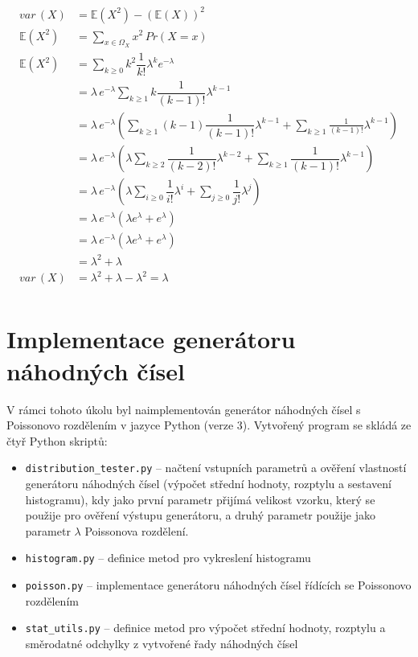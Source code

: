 \documentclass[12pt, a4paper]{article}
\let\oldsection\section
\renewcommand\section{\clearpage\oldsection}
\begin{document}
    \begin{equation}
        \label{variance}
        \begin{split}
            var\,(X) & = \mathbb{E} (X^2) - (\mathbb{E} (X))^2 \\
            \mathbb{E} (X^2) &= \sum_{x \mathop \in \Omega_{X}} x^2 \, Pr(X = x) \\
            \mathbb{E} (X^2) &= \sum_{k \mathop \ge 0} {k^2 \dfrac 1 {k!} \lambda^k e^{-\lambda} } \\
            & = \lambda\, e^{-\lambda} \sum_{k \mathop \ge 1} {k \dfrac 1 {(k - 1)!} \lambda^{k - 1} } \\
            & = \lambda\, e^{-\lambda} ( \sum_{k \mathop \ge 1} {(k - 1) \dfrac 1 {(k - 1)!} \lambda^{k - 1} } + \sum_{k \mathop \ge 1} {\frac 1 {(k - 1)!} \lambda^{k - 1} }  ) \\
            & = \lambda\, e^{-\lambda} ( \lambda \sum_{k \mathop \ge 2} {\dfrac 1 {(k - 2)!} \lambda^{k - 2} } + \sum_{k \mathop \ge 1} {\dfrac 1 {(k - 1)!} \lambda^{k - 1} } ) \\
            & = \lambda\, e^{-\lambda} ( \lambda \sum_{i \mathop \ge 0} {\dfrac 1 {i!} \lambda^i} + \sum_{j \mathop \ge 0} {\dfrac 1 {j!} \lambda^j} ) \\
            & = \lambda\, e^{-\lambda} ( \lambda e^\lambda + e^\lambda) \\
            & = \lambda\, e^{-\lambda} ( \lambda e^\lambda + e^\lambda) \\
            & = \lambda^2 + \lambda \\
            var\,(X) & = \lambda^{2} + \lambda - \lambda^{2} = \lambda \\
        \end{split}
    \end{equation}


    \section{Implementace generátoru náhodných čísel}

    V rámci tohoto úkolu byl naimplementován generátor náhodných čísel s Poissonovo rozdělením v jazyce Python (verze 3).
    Vytvořený program se skládá ze čtyř Python skriptů:
    \begin{itemize}
        \item \texttt{distribution\_tester.py} -- načtení vstupních parametrů a ověření vlastností generátoru náhodných čísel (výpočet střední hodnoty, rozptylu a sestavení histogramu),
        kdy jako první parametr přijímá velikost vzorku, který se použije pro ověření výstupu generátoru, a druhý parametr
        použije jako parametr $\lambda$ Poissonova rozdělení.
        \item \texttt{histogram.py} -- definice metod pro vykreslení histogramu
        \item \texttt{poisson.py} -- implementace generátoru náhodných čísel řídících se Poissonovo rozdělením
        \item \texttt{stat_utils.py} -- definice metod pro výpočet střední hodnoty, rozptylu a směrodatné odchylky z vytvořené řady náhodných čísel
    \end{itemize}
\end{document}
